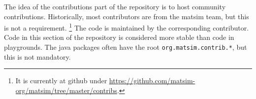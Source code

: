 


The idea of the \glspl{contribution} part of the repository is to host community contributions.
Historically, most contributors are from the \gls{matsim} team, but this is not a requirement.%
\footnote{
It is currently at \gls{github} under \url{https://github.com/matsim-org/matsim/tree/master/contribs}.  
}
The code is maintained by the corresponding contributor. 
Code in this section of the repository is considered more stable than code in playgrounds.
The \gls{java} packages often have the root \lstinline{org.matsim.contrib.*}, but this is not mandatory.

